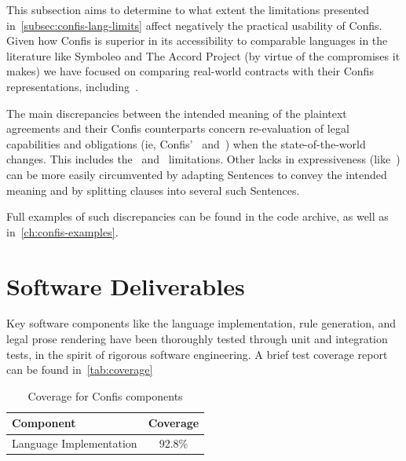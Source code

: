 This subsection aims to determine to what extent the limitations presented in~\autoref{subsec:confis-lang-limits} affect negatively the practical usability of Confis.
Given how Confis is superior in its accessibility to comparable languages in the literature like Symboleo and The Accord Project (by virtue of the compromises it makes) we have focused on comparing real-world contracts with their Confis representations, including~\cite{economistIU2016licence, symboleoMeat, jetbrainsToolbox, seismicDataLicence}.

The main discrepancies between the intended meaning of the plaintext agreements and their Confis counterparts concern re-evaluation of legal capabilities and obligations (ie, Confis'~ and~) when the state-of-the-world changes.
This includes the~ and~ limitations.
Other lacks in expressiveness (like~) can be more easily circumvented by adapting Sentences to convey the intended meaning and by splitting clauses into several such Sentences.

Full examples of such discrepancies can be found in the code archive, as well as in~\autoref{ch:confis-examples}.


\section{Software Deliverables}\label{sec:software-deliverables}

Key software components like the language implementation, rule generation, and legal prose rendering have been thoroughly tested through unit and integration tests, in the spirit of rigorous software engineering.
A brief test coverage report can be found in~\autoref{tab:coverage}

\begin{table}[h]
    \centering
    \begin{tabular}{l|c}
        Component & Coverage\\
        \hline
        Language Implementation & 92.8\%
    \end{tabular}
    \caption{Coverage for Confis components}
    \label{tab:coverage}
\end{table}
